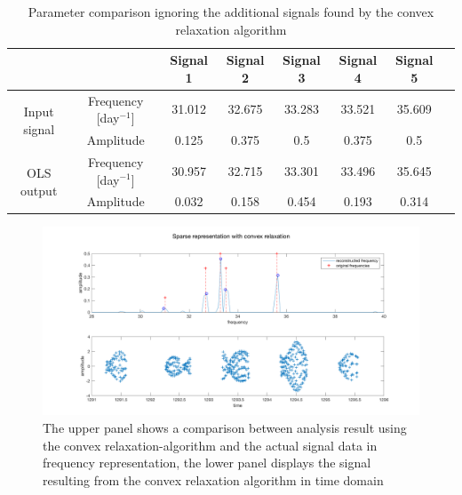 \begin{table}[h!]
\centering
\begin{tabular}{ | c| c| c| c| c| c|c|c| }
\hline
	&   & Signal 1 & Signal 2 & Signal 3 & Signal 4 & Signal 5 \\ \hline
\multirow{2}{3cm}{Input signal} & Frequency [day$^{-1}$] & 31.012 & 32.675 & 33.283 & 33.521 & 35.609 \\ \cline{2-7}
 & Amplitude & 0.125 & 0.375 & 0.5 & 0.375 & 0.5 \\ \hline

\multirow{2}{3cm}{OLS output} & Frequency [day$^{-1}$] &30.957  & 32.715 & 33.301 & 33.496  & 35.645  \\ \cline{2-7}
 & Amplitude & 0.032 & 0.158 & 0.454  & 0.193  & 0.314 \\ \hline

\end{tabular}
\caption{Parameter comparison ignoring the additional signals found by the convex relaxation algorithm}
\label{tab:convex}
\end{table}


\begin{figure}[!h]
	\centering
		\includegraphics[width=\textwidth]{images/convex}
		\caption{The upper panel shows a comparison between analysis result using the convex relaxation-algorithm and the actual signal data in frequency representation, the lower panel displays the signal resulting from the convex relaxation algorithm in time domain}
		\label{fig:convex}
\end{figure}



